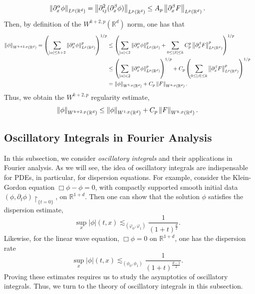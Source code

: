 \documentclass{article}
\begin{document}
\begin{example}
	\begin{equation*}
		\left\Vert \partial_{x}^{\alpha}\phi \right\Vert_{L^{p}(\mathbb{R}^{d})} = \left\Vert \partial_{ij}^{2}(\partial_{x}^{\beta}\phi) \right\Vert_{L^{p}(\mathbb{R}^{d})} \leq A_{p}\left\Vert \partial_{x}^{\beta}F \right\Vert_{L^{p}(\mathbb{R}^{d})}. 
	\end{equation*}
	Then, by definition of the $W^{k + 2, p}(\mathbb{R}^{d})$ norm, one has that 
	\begin{align*}
		\begin{split}
		\left\Vert \phi \right\Vert_{W^{k + 2,p}(\mathbb{R}^{d})} = \left(\sum_{|\alpha|\leq k + 2}\left\Vert \partial^{\alpha}_{x}\phi \right\Vert_{L^{p}(\mathbb{R}^{d})}^{p}\right)^{1/p}&\leq \left(\sum_{|\alpha| < 2}\left\Vert \partial_{x}^{\alpha}\phi \right\Vert^{p}_{L^{p}(\mathbb{R}^{d})} + \sum_{0 \leq |\beta|\leq k}C_{p}^{p}\left\Vert \partial_{x}^{\beta}F \right\Vert_{L^{p}(\mathbb{R}^{d})}^{p}\right)^{1/p}  \\
		&\leq \left(\sum_{|\alpha| < 2}\left\Vert \partial_{x}^{\alpha}\phi \right\Vert_{L^{p}(\mathbb{R}^{d})}^{p}\right)^{1/p} + C_{p}\left(\sum_{0\leq |\beta|\leq k}\left\Vert \partial_{x}^{\beta}F \right\Vert_{L^{p}(\mathbb{R}^{d})}^{p}\right)^{1/p} \\
		&= \left\Vert \phi \right\Vert_{W^{1,p}(\mathbb{R}^{d})} + C_{p} \left\Vert F \right\Vert_{W^{k, p}(\mathbb{R}^{d})}. 
		\end{split} 
	\end{align*} 
	Thus, we obtain the $W^{k + 2, p}$ regularity estimate, 
	\begin{equation*}
		\left\Vert \phi \right\Vert_{W^{k + 2, p}(\mathbb{R}^{d})} \leq \left\Vert \phi \right\Vert_{W^{1,p}(\mathbb{R}^{d})} + C_{p} \left\Vert F \right\Vert_{W^{k, p}(\mathbb{R}^{d})}. 
	\end{equation*}
\end{example} 

\newpage 
\subsection{Oscillatory Integrals in Fourier Analysis}
In this subsection, we consider \textit{oscillatory integrals} and their applications in Fourier analysis. As we will see, the idea of oscillatory integrals are indispensable for PDEs, in particular, for dispersion equations. For example, consider the Klein-Gordon equation $\Box \phi - \phi = 0$, with compactly supported smooth initial data $(\phi, \partial_{t}\phi)\upharpoonright_{\{t = 0\}}$, on $\mathbb{R}^{1 + d}$. Then one can show that the solution $\phi$ satisfies the dispersion estimate, 
\begin{equation*}
	\sup_{x}|\phi|(t, x) \lesssim_{(\varphi_{0}, \varphi_{1})}\frac{1}{\left(1 + t\right)^{\frac{d}{2}}}. 
\end{equation*} 
Likewise, for the linear wave equation, $\Box \phi = 0$ on $\mathbb{R}^{1 + d}$, one has the dispersion rate 
\begin{equation*}
	\sup_{x}|\phi|(t, x) \lesssim_{(\phi_{0}, \phi_{1})} \frac{1}{(1 + t)^{\frac{d - 1}{2}}}. 
\end{equation*}
Proving these estimates requires us to study the asymptotics of oscillatory integrals. Thus, we turn to the theory of oscillatory integrals in this subsection. 
\end{document}
